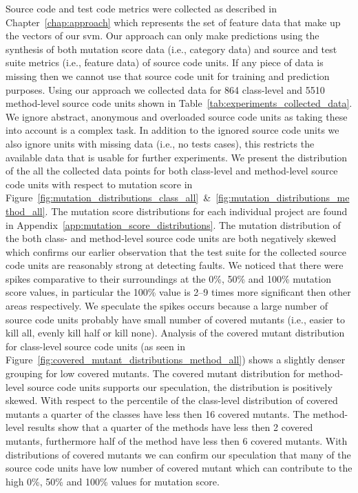 Source code and test code metrics were collected as described in Chapter~\ref{chap:approach} which represents the set of feature data that make up the vectors of our \gls{svm}. Our approach can only make predictions using the synthesis of both mutation score data (i.e., category data) and source and test suite metrics (i.e., feature data) of source code units. If any piece of data is missing then we cannot use that source code unit for training and prediction purposes. Using our approach we collected data for 864 class-level and 5510 method-level source code units shown in Table~\ref{tab:experiments_collected_data}. We ignore abstract, anonymous and overloaded source code units as taking these into account is a complex task. In addition to the ignored source code units we also ignore units with missing data (i.e., no tests cases), this restricts the available data that is usable for further experiments. We present the distribution of the all the collected data points for both class-level and method-level source code units with respect to mutation score in Figure~\ref{fig:mutation_distributions_class_all}~\&~\ref{fig:mutation_distributions_method_all}. The mutation score distributions for each individual project are found in Appendix~\ref{app:mutation_score_distributions}. The mutation distribution of the both class- and method-level source code units are both negatively skewed which confirms our earlier observation that the test suite for the collected source code units are reasonably strong at detecting faults. We noticed that there were spikes comparative to their surroundings at the  0\%, 50\% and 100\% mutation score values, in particular the 100\% value is 2--9 times more significant then other areas respectively. We speculate the spikes occurs because a large number of source code units probably have small number of covered mutants (i.e., easier to kill all, evenly kill half or kill none). Analysis of the covered mutant distribution for class-level source code units (as seen in Figure~\ref{fig:covered_mutant_distributions_method_all}) shows a slightly denser grouping for low covered mutants. The covered mutant distribution for method-level source code units supports our speculation, the distribution is positively skewed. With respect to the percentile of the class-level distribution of covered mutants a quarter of the classes have less then 16 covered mutants. The method-level results show that a quarter of the methods have less then 2 covered mutants, furthermore half of the method have less then 6 covered mutants. With distributions of covered mutants we can confirm our speculation that many of the source code units have low number of covered mutant which can contribute to the high 0\%, 50\% and 100\% values for mutation score.

